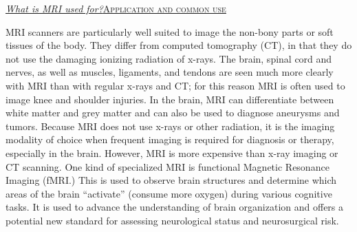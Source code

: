 \documentclass[12pt, a3paper]{article}
\begin{document}
     \vspace{0.5cm}
     \begin{flushleft}
     \underline{\textit{What is MRI used for?}\textsc{Application and common use}}\\
     \end{flushleft}
      
     MRI scanners are particularly well suited to image the non-bony parts or soft tissues of the body. They differ from computed tomography (CT), in that they do not use the damaging ionizing radiation of x-rays. The brain, spinal cord and nerves, as well as muscles, ligaments, and tendons are seen much more clearly with MRI than with regular x-rays and CT; for this reason MRI is often used to image knee and shoulder injuries. In the brain, MRI can differentiate between white matter and grey matter and can also be used to diagnose aneurysms and tumors. Because MRI does not use x-rays or other radiation, it is the imaging modality of choice when frequent imaging is required for diagnosis or therapy, especially in the brain. However, MRI is more expensive than x-ray imaging or CT scanning. One kind of specialized MRI is functional Magnetic Resonance Imaging (fMRI.) This is used to observe brain structures and determine which areas of the brain “activate” (consume more oxygen) during various cognitive tasks. It is used to advance the understanding of brain organization and offers a potential new standard for assessing neurological status and neurosurgical risk.
     
\end{document}
